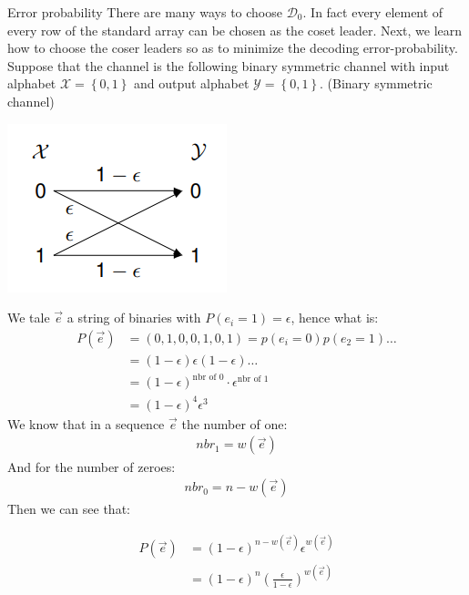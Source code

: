 \begin{parag}{Error probability}
    There are many ways to choose $\mathcal{D}_0$.  In fact every element of every row of the standard array can be chosen as the coset leader. Next, we learn how to choose the coser leaders so as to minimize the decoding error-probability.\\
    Suppose that the channel is the following binary symmetric channel with input alphabet $\mathcal{X} = \left\{0, 1\right\}$ and output alphabet $\mathcal{Y} = \left\{0, 1\right\}$. (Binary symmetric channel)
    \begin{center}
        \includegraphics[scale=0.8]{12025-05-21.png}
    \end{center}
    We tale $\vec{e}$ a string of  binaries with $P\left(e_i =  1\right) =  \epsilon$, hence what is:
    \begin{align*} 
        P\left(\vec{e}\right) &=  \left(0, 1, 0, 0, 1, 0, 1\right) = p\left(e_i= 0\right)p\left(e_2= 1\right)\ldots\\
                        &= \left(1-\epsilon\right)\epsilon\left(1-\epsilon\right)\ldots\\
                        &= \left(1-\epsilon\right)^{\text{nbr of 0}}\cdot \epsilon^{\text{nbr of 1}}\\
                        &= \left(1-\epsilon\right)^4\epsilon^3 
    \end{align*}
    We know that in a sequence $\vec{e}$ the number of one:
\begin{align*} nbr_1 =  w\left(\vec{e}\right) \end{align*}
And for the number of zeroes:
\begin{align*} 
    nbr_0 =  n - w\left(\vec{e}\right)
\end{align*}
Then we can see that:
\begin{formule}
\begin{align*} 
    P\left(\vec{e}\right) &=  \left(1-\epsilon\right)^{n-w\left(\vec{e}\right)}\epsilon^{w\left(\vec{e}\right)}\\
    &= \left(1-\epsilon\right)^n\left(\frac{\epsilon}{1-\epsilon}\right)^{w\left(\vec{e}\right)}
\end{align*}
\end{formule}
    

\end{parag}
